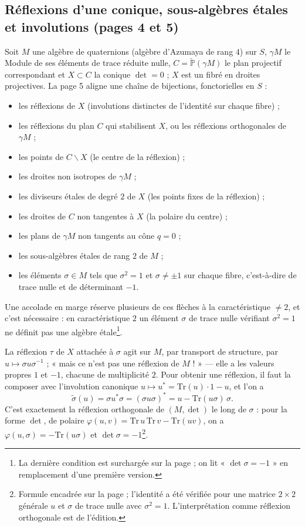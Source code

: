 \documentclass[11pt,a4paper]{article}
\begin{document}
\subsection*{Réflexions d'une conique, sous-algèbres étales et involutions (pages 4 et 5)}

Soit $M$ une algèbre de quaternions (algèbre d'Azumaya de rang $4$) sur $S$,
$\gamma M$ le Module de ses éléments de trace réduite nulle, $C =
\check{\mathbb{P}}(\gamma M)$ le plan projectif correspondant et $X \subset C$ la
conique $\det = 0$ ; $X$ est un fibré en droites projectives. La page 5 aligne
une chaîne de bijections, fonctorielles en $S$ :
\begin{itemize}
  \item les réflexions de $X$ (involutions distinctes de l'identité sur chaque
    fibre) ;
  \item les réflexions du plan $C$ qui stabilisent $X$, ou les réflexions
    orthogonales de $\gamma M$ ;
  \item les points de $C \smallsetminus X$ (le centre de la réflexion) ;
  \item les droites non isotropes de $\gamma M$ ;
  \item les diviseurs étales de degré $2$ de $X$ (les points fixes de la
    réflexion) ;
  \item les droites de $C$ non tangentes à $X$ (la polaire du centre) ;
  \item les plans de $\gamma M$ non tangents au cône $q = 0$ ;
  \item les sous-algèbres étales de rang $2$ de $M$ ;
  \item les éléments $\sigma \in M$ tels que $\sigma^2 = 1$ et $\sigma \neq \pm 1$
    sur chaque fibre, c'est-à-dire de trace nulle et de déterminant $-1$.
\end{itemize}
Une accolade en marge réserve plusieurs de ces flèches à la caractéristique
$\neq 2$, et c'est nécessaire : en caractéristique $2$ un élément $\sigma$ de
trace nulle vérifiant $\sigma^2 = 1$ ne définit pas une algèbre
étale\footnote{La dernière condition est surchargée sur la page ; on lit
« $\det \sigma = -1$ » en remplacement d'une première version.}.

La réflexion $\tau$ de $X$ attachée à $\sigma$ agit sur $M$, par transport de
structure, par $u \mapsto \sigma u \sigma^{-1}$ ; « mais ce n'est pas une
réflexion de $M$ ! » — elle a les valeurs propres $1$ et $-1$, chacune de
multiplicité $2$. Pour obtenir une réflexion, il faut la composer avec
l'involution canonique $u \mapsto u^{*} = \mathrm{Tr}(u)\cdot 1 - u$, et l'on a
\[
  \tilde{\sigma}(u) = \sigma u^{*} \sigma = (\sigma u \sigma)^{*}
  = u - \mathrm{Tr}(u\sigma)\, \sigma .
\]
C'est exactement la réflexion orthogonale de $(M, \det)$ le long de $\sigma$ :
pour la forme $\det$, de polaire $\varphi(u, v) = \mathrm{Tr}\,u\,\mathrm{Tr}\,v -
\mathrm{Tr}(uv)$, on a $\varphi(u, \sigma) = -\mathrm{Tr}(u\sigma)$ et
$\det\sigma = -1$\footnote{Formule encadrée sur la page ; l'identité a été
vérifiée pour une matrice $2 \times 2$ générale $u$ et $\sigma$ de trace nulle
avec $\sigma^2 = 1$. L'interprétation comme réflexion orthogonale est de
l'édition.}.
\end{document}
